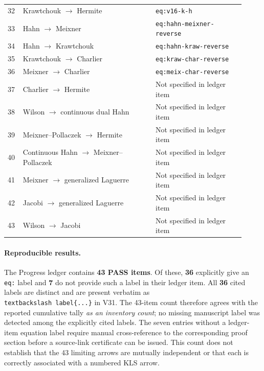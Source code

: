\documentclass[11pt]{article}
\begin{document}
\begin{longtable}{@{}p{0.05\linewidth}p{0.52\linewidth}p{0.35\linewidth}@{}}
32 & Krawtchouk $\ensuremath{\to}$ Hermite & \texttt{eq:v16-k-h} \\
33 & Hahn $\ensuremath{\to}$ Meixner & \texttt{eq:hahn-meixner-reverse} \\
34 & Hahn $\ensuremath{\to}$ Krawtchouk & \texttt{eq:hahn-kraw-reverse} \\
35 & Krawtchouk $\ensuremath{\to}$ Charlier & \texttt{eq:kraw-char-reverse} \\
36 & Meixner $\ensuremath{\to}$ Charlier & \texttt{eq:meix-char-reverse} \\
37 & Charlier $\ensuremath{\to}$ Hermite & Not specified in ledger item \\
38 & Wilson $\ensuremath{\to}$ continuous dual Hahn & Not specified in ledger item \\
39 & Meixner--Pollaczek $\ensuremath{\to}$ Hermite & Not specified in ledger item \\
40 & Continuous Hahn $\ensuremath{\to}$ Meixner--Pollaczek & Not specified in ledger item \\
41 & Meixner $\ensuremath{\to}$ generalized Laguerre & Not specified in ledger item \\
42 & Jacobi $\ensuremath{\to}$ generalized Laguerre & Not specified in ledger item \\
43 & Wilson $\ensuremath{\to}$ Jacobi & Not specified in ledger item \\
\end{longtable}\endgroup

\paragraph{Reproducible results.} The Progress ledger contains \textbf{43 PASS items}. Of these, \textbf{36} explicitly give an \texttt{eq:} label and \textbf{7} do not provide such a label in their ledger item. All \textbf{36} cited labels are distinct and are present verbatim as \texttt{\\textbackslash label\{...\}} in V31. The 43-item count therefore agrees with the reported cumulative tally \emph{as an inventory count}; no missing manuscript label was detected among the explicitly cited labels. The seven entries without a ledger-item equation label require manual cross-reference to the corresponding proof section before a source-link certificate can be issued. This count does not establish that the 43 limiting arrows are mutually independent or that each is correctly associated with a numbered KLS arrow.
\end{document}
